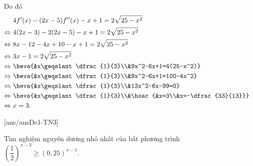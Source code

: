 \begin{ex}
{\begin{itemchoice}
Do đó
\[\begin{aligned}
& \ 4f'(x)-(2x-5)f'' (x)-x+1=2\sqrt{25-x^2} \\
\Leftrightarrow & \ 4(2x-3)-2(2x-5)-x+1=2\sqrt{25-x^2} \\
\Leftrightarrow & \ 8x-12-4x+10-x+1=2\sqrt{25-x^2} \\
\Leftrightarrow & \ 3x-1=2\sqrt{25-x^2} \\
\Leftrightarrow & \ \heva{&x\geqslant \dfrac{1}{3}\\&9x^2-6x+1=4(25-x^2)} \\
\Leftrightarrow & \ \heva{&x\geqslant \dfrac{1}{3}\\&9x^2-6x+1=100-4x^2} \\
\Leftrightarrow & \ \heva{&x\geqslant \dfrac{1}{3}\\&13x^2-6x-99=0} \\
\Leftrightarrow & \ \heva{&x\geqslant \dfrac{1}{3}\\&\hoac{&x=3\\&x=-\dfrac{33}{13}}} \\
\Leftrightarrow & \ x=3.
\end{aligned}\]
\end{itemchoice}
}
\end{ex}

\TNSA
{}[ans/ansDe1-TN3]
\begin{ex}%
Tìm nghiệm nguyên dương nhỏ nhất của bất phương trình $\left(\dfrac{1}{2}\right)^{x-3}\ge(0,25)^{x-1}$.
\end{ex}

